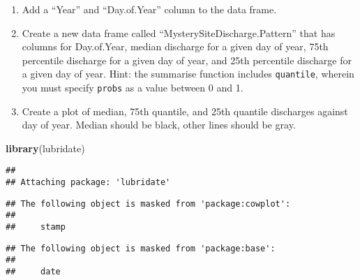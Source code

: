\documentclass[]{article}
\newenvironment{Shaded}{\begin{snugshade}}{\end{snugshade}}
\newcommand{\DataTypeTok}[1]{\textcolor[rgb]{0.13,0.29,0.53}{#1}}
\newcommand{\DecValTok}[1]{\textcolor[rgb]{0.00,0.00,0.81}{#1}}
\newcommand{\KeywordTok}[1]{\textcolor[rgb]{0.13,0.29,0.53}{\textbf{#1}}}
\newcommand{\NormalTok}[1]{#1}
\newcommand{\OperatorTok}[1]{\textcolor[rgb]{0.81,0.36,0.00}{\textbf{#1}}}
\newcommand{\StringTok}[1]{\textcolor[rgb]{0.31,0.60,0.02}{#1}}
\providecommand{\tightlist}{%
  \setlength{\itemsep}{0pt}\setlength{\parskip}{0pt}}
\begin{document}
\begin{enumerate}
\def\labelenumi{\arabic{enumi}.}
\setcounter{enumi}{4}
\tightlist
\item
  Add a ``Year'' and ``Day.of.Year'' column to the data frame.
\item
  Create a new data frame called ``MysterySiteDischarge.Pattern'' that
  has columns for Day.of.Year, median discharge for a given day of year,
  75th percentile discharge for a given day of year, and 25th percentile
  discharge for a given day of year. Hint: the summarise function
  includes \texttt{quantile}, wherein you must specify \texttt{probs} as
  a value between 0 and 1.
\item
  Create a plot of median, 75th quantile, and 25th quantile discharges
  against day of year. Median should be black, other lines should be
  gray.
\end{enumerate}

\begin{Shaded}
\begin{Highlighting}[]
\KeywordTok{library}\NormalTok{(lubridate)}
\end{Highlighting}
\end{Shaded}

\begin{verbatim}
## 
## Attaching package: 'lubridate'
\end{verbatim}

\begin{verbatim}
## The following object is masked from 'package:cowplot':
## 
##     stamp
\end{verbatim}

\begin{verbatim}
## The following object is masked from 'package:base':
## 
##     date
\end{verbatim}

\begin{Shaded}
\end{Shaded}
\end{document}
